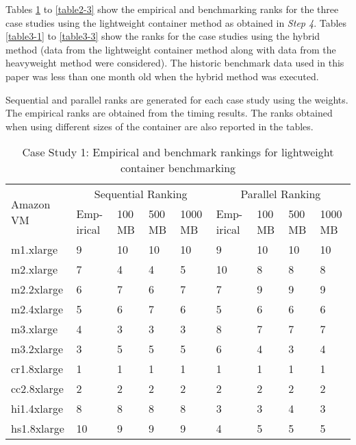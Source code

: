 Tables \ref{table2-1} to \ref{table2-3} show the empirical and benchmarking ranks for the three case studies using the lightweight container method as obtained in \textit{Step 4}. Tables \ref{table3-1} to \ref{table3-3} show the ranks for the case studies using the hybrid method (data from the lightweight container method along with data from the heavyweight method were considered). The historic benchmark data used in this paper was less than one month old when the hybrid method was executed.

Sequential and parallel ranks are generated for each case study using the weights. The empirical ranks are obtained from the timing results. The ranks obtained when using different sizes of the container are also reported in the tables. 

\begin{table}[h]
\centering
\begin{tabular}{ |p{1.4cm}|p{0.4cm}|p{0.4cm}|p{0.4cm}|p{0.4cm}|p{0.4cm}|p{0.4cm}|p{0.4cm}|p{0.4cm}|  }
\hline
\multirow{2}{*}{Amazon VM} & \multicolumn{4}{|c|}{Sequential Ranking} &
\multicolumn{4}{|c|}{Parallel Ranking}\\ \cline{2-9}
& Emp-irical & 100 MB & 500 MB & 1000 MB & Emp-irical & 100 MB & 500 MB & 1000 MB \\
\hline
\hline
m1.xlarge   & 9    &10     &10     &10     &9      &10     &10     &10 \\
m2.xlarge   & 7     &4      &4      &5      &10     &8      &8      &8 \\
m2.2xlarge  & 6     &7      &6      &7      &7      &9      &9      &9 \\
m2.4xlarge  & 5     &6      &7      &6      &5      &6      &6      &6 \\
m3.xlarge   & 4     &3      &3      &3      &8      &7      &7      &7 \\
m3.2xlarge  & 3     &5      &5      &5      &6      &4      &3      &4 \\
cr1.8xlarge & 1     &1      &1      &1      &1      &1      &1      &1 \\
cc2.8xlarge & 2     &2      &2      &2      &2      &2      &2      &2 \\
hi1.4xlarge & 8     &8      &8      &8      &3      &3      &4      &3 \\
hs1.8xlarge & 10     &9      &9      &9      &4      &5      &5      &5 \\
\hline
\end{tabular}
\caption{Case Study 1: Empirical and benchmark rankings for lightweight container benchmarking}
\label{table2-1}
\end{table}

